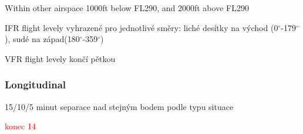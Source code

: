 Within other airspace
1000ft below FL290, and
2000ft above FL290

IFR flight levely vyhrazené pro jednotlivé směry: liché desítky na východ (0$^{\circ}$-179$^{\circ}$), sudé na západ(180$^{\circ}$-359$^{\circ}$)

VFR flight levely končí pětkou

\subsubsection{Longitudinal}
15/10/5 minut separace nad stejným bodem podle typu situace 
\cite[Chapter 5.4.2.2]{doc4444}


\textcolor{red}{konec 14}